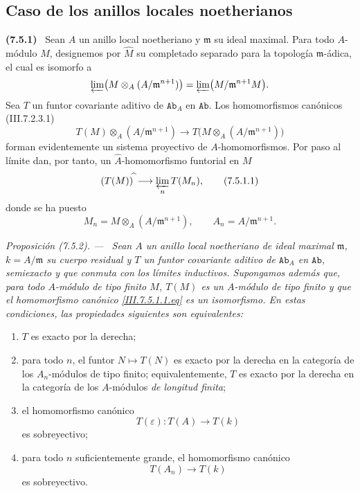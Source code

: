 \documentclass[10pt,oneside]{book}
\newcommand{\cat}[1]{\mathtt{#1}}
\newcommand{\sref}[2][]{\textup{(#2)}}
\newcommand{\oldpage}[2][]{\setcounter{footnote}{0}\marginpar{\scriptsize\textbf{#1}~|~#2}\ignorespaces}
\newenvironment{env}[1][]{\par\medskip\noindent\textbf{(#1)}\ }{\par}
\newenvironment{proposition}[1][]{\par\medskip\noindent\itshape Proposición (#1). ---\ }{\par}
\begin{document}
\oldpage[III]{190}
\subsection{Caso de los anillos locales noetherianos}
\label{subsection:III.7.5}

\begin{env}[7.5.1]
\label{III.7.5.1}
Sean $A$ un anillo local noetheriano y $\mathfrak m$ su ideal
maximal. Para todo $A$-módulo $M$, designemos por $\widehat M$ su
completado separado para la topología $\mathfrak m$-ádica, el cual es
isomorfo a
\[
  \varprojlim
  \bigl(M\otimes_A(A/\mathfrak m^{n+1})\bigr)
  =
  \varprojlim
  \bigl(M/\mathfrak m^{n+1}M\bigr).
\]
Sea $T$ un funtor covariante aditivo de $\cat{Ab}_A$ en
$\cat{Ab}$. Los homomorfismos canónicos
\sref{III.7.2.3.1}
\[
  T(M)\otimes_A(A/\mathfrak m^{n+1})
  \longrightarrow
  T\bigl(M\otimes_A(A/\mathfrak m^{n+1})\bigr)
\]
forman evidentemente un sistema proyectivo de $A$-homomorfismos. Por
paso al límite dan, por tanto, un $\widehat A$-homomorfismo funtorial
en $M$
\[
  (T(M))^{\widehat{\,}}
  \longrightarrow
  \varprojlim_n T(M_n),
  \tag{7.5.1.1}\label{III.7.5.1.1.eq}
\]
donde se ha puesto
\[
  M_n=M\otimes_A(A/\mathfrak m^{n+1}),
  \qquad
  A_n=A/\mathfrak m^{n+1}.
\]
\end{env}

\begin{proposition}[7.5.2]
\label{III.7.5.2}
Sean $A$ un anillo local noetheriano de ideal maximal $\mathfrak m$,
$k=A/\mathfrak m$ su cuerpo residual y $T$ un funtor covariante
aditivo de $\cat{Ab}_A$ en $\cat{Ab}$, semiexacto y que conmuta con
los límites inductivos. Supongamos además que, para todo $A$-módulo
de tipo finito $M$, $T(M)$ es un $A$-módulo de tipo finito y que el
homomorfismo canónico \eqref{III.7.5.1.1.eq} es un isomorfismo. En
estas condiciones, las propiedades siguientes son equivalentes:
\begin{enumerate}
  \item[(a)] $T$ es exacto por la derecha;
  \item[(b)] para todo $n$, el funtor $N\mapsto T(N)$ es exacto por
    la derecha en la categoría de los $A_n$-módulos de tipo finito;
    equivalentemente, $T$ es exacto por la derecha en la categoría
    de los $A$-módulos \emph{de longitud finita};
  \item[(c)] el homomorfismo canónico
    \[
      T(\varepsilon):T(A)\longrightarrow T(k)
    \]
    es sobreyectivo;
  \item[(d)] para todo $n$ suficientemente grande, el homomorfismo
    canónico
    \[
      T(A_n)\longrightarrow T(k)
    \]
    es sobreyectivo.
\end{enumerate}
\end{proposition}
\end{document}

